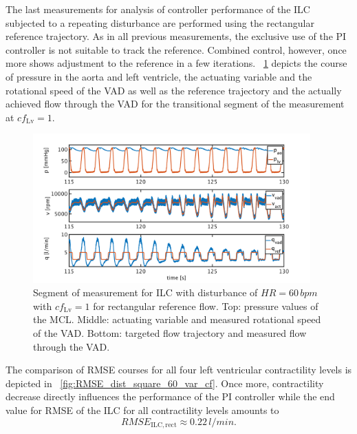 The last measurements for analysis of controller performance of the ILC subjected to a repeating disturbance are performed using the rectangular reference trajectory. As in all previous measurements, the exclusive use of the PI controller is not suitable to track the reference. Combined control, however, once more shows adjustment to the reference in a few iterations. \figurename~\ref{fig:pi_to_ilc_dist_square_60_cf1} depicts the course of pressure in the aorta and left ventricle, the actuating variable and the rotational speed of the VAD as well as the reference trajectory and the actually achieved flow through the VAD for the transitional segment of the measurement at $cf_{\mathrm{Lv}}=1$.
\begin{figure}[ht!]
  \centering
  \includegraphics[width=0.95\textwidth]{images/chapt_5/ILC/pi_to_ilc_dist_square_60_cf1.pdf}
  \caption[Segment of measurement for ILC with disturbance of $HR=60\,bpm$ with $cf_{\mathrm{Lv}}=1$ for rectangular reference flow]{Segment of measurement for ILC with disturbance of $HR=60\,bpm$ with $cf_{\mathrm{Lv}}=1$ for rectangular reference flow. Top:  pressure values of the MCL. Middle: actuating variable and measured rotational speed of the VAD. Bottom: targeted flow trajectory and measured flow through the VAD.}
  \label{fig:pi_to_ilc_dist_square_60_cf1}
\end{figure}
\newpage
The comparison of RMSE courses for all four left ventricular contractility levels is depicted in \figurename~\ref{fig:RMSE_dist_square_60_var_cf}. Once more, contractility decrease directly influences the performance of the PI controller while the end value for RMSE of the ILC for all contractility levels amounts to
\begin{equation}
  RMSE_{\mathrm{ILC,rect}}\approx 0.22\,l/min.
\end{equation}
